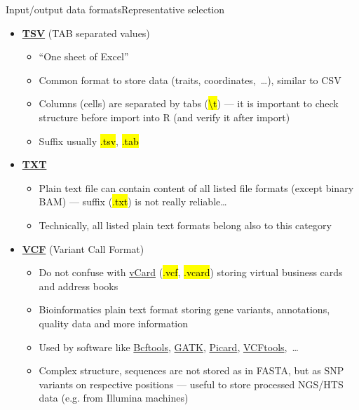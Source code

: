 \documentclass[compress, ucs, xelatex, 11pt, xcolor=svgnames,
	hyperref={
		bookmarks=true,
		unicode=true,
		colorlinks=true,
		pdftitle={Molecular data in R},
		plainpages=false,
		pdfauthor={Vojtech Zeisek},
		pdfsubject={Course about phylogeny and evolution in R},
		pdfcreator={XeLaTeX},
		pdfkeywords={R, evolution, phylogeny, molecular data},
		linkcolor=Tomato,
		anchorcolor=SaddleBrown,
		citecolor=Goldenrod,
		filecolor=DarkMagenta,
		menucolor=Sienna,
		urlcolor=DarkTurquoise,
		pdftex},
	url={hyphens, lowtilde} %
	]{beamer}
\renewcommand{\texttt}[1]{\hl{\ttfamily #1}}
\begin{document}
\begin{frame}[allowframebreaks]{Input/output data formats}{Representative selection}
\begin{itemize}
\begin{itemize}
			\item Used by applications like \href{https://github.com/pezmaster31/bamtools/wiki}{bamtools} or \href{https://www.htslib.org/}{SAMtools}
			\item Suffix usually \texttt{*.sam}
		\end{itemize}
		\item \href{https://en.wikipedia.org/wiki/Tab-separated_values}{\textbf{TSV}} (TAB separated values)
		\begin{itemize}
			\item ``One sheet of Excel''
			\item Common format to store data (traits, coordinates,~\ldots), similar to CSV
			\item Columns (cells) are separated by tabs (\texttt{\textbackslash t}) --- it is important to check structure before import into R (and verify it after import)
			\item Suffix usually \texttt{*.tsv}, \texttt{*.tab}
		\end{itemize}
		\item \href{https://en.wikipedia.org/wiki/Text_file}{\textbf{TXT}}
		\begin{itemize}
			\item Plain text file can contain content of all listed file formats (except binary BAM) --- suffix (\texttt{*.txt}) is not really reliable\ldots
			\item Technically, all listed plain text formats belong also to this category
		\end{itemize}
		\item \href{https://en.wikipedia.org/wiki/Variant_Call_Format}{\textbf{VCF}} (Variant Call Format)
		\begin{itemize}
			\item Do not confuse with \href{https://en.wikipedia.org/wiki/VCard}{vCard} (\texttt{*.vcf}, \texttt{*.vcard}) storing virtual business cards and address books
			\item Bioinformatics plain text format storing gene variants, annotations, quality data and more information
			\item Used by software like \href{https://samtools.github.io/bcftools/}{Bcftools}, \href{https://software.broadinstitute.org/gatk/}{GATK}, \href{https://broadinstitute.github.io/picard/}{Picard}, \href{https://vcftools.github.io/}{VCFtools},~\ldots
			\item Complex structure, sequences are not stored as in FASTA, but as SNP variants on respective positions --- useful to store processed NGS/HTS data (e.g. from Illumina machines)

\end{itemize}
\end{itemize}
\end{frame}
\end{document}
